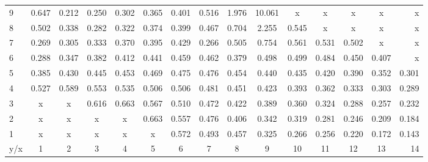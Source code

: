 \begin{tabular}{| l || c | c | c | c | c | c | c | c | c | c | c | c | c | r |}
\hline
9   &0.647	&0.212	&0.250	&0.302	&0.365	&0.401	&0.516	&1.976	&10.061	&x	    &x	    &x	    &x	    &x\\
8   &0.502	&0.338	&0.282	&0.322	&0.374	&0.399	&0.467	&0.704	&2.255	&0.545	&x	    &x	    &x	    &x\\
7   &0.269	&0.305	&0.333	&0.370	&0.395	&0.429	&0.266	&0.505	&0.754	&0.561	&0.531	&0.502	&x	    &x\\
6   &0.288	&0.347	&0.382	&0.412	&0.441	&0.459	&0.462	&0.379	&0.498	&0.499	&0.484	&0.450	&0.407	&x\\
5   &0.385	&0.430	&0.445	&0.453	&0.469	&0.475	&0.476	&0.454	&0.440	&0.435	&0.420	&0.390	&0.352	&0.301\\
4   &0.527	&0.589	&0.553	&0.535	&0.506	&0.506	&0.481	&0.451	&0.423	&0.393	&0.362	&0.333	&0.303	&0.289\\
3   &x	    &x	    &0.616	&0.663	&0.567	&0.510	&0.472	&0.422	&0.389	&0.360	&0.324	&0.288	&0.257	&0.232\\
2   &x	    &x	    &x	    &x	    &0.663	&0.557	&0.476	&0.406	&0.342	&0.319	&0.281	&0.246	&0.209	&0.184\\
1   &x	    &x	    &x	    &x	    &x	    &0.572	&0.493	&0.457	&0.325	&0.266	&0.256	&0.220	&0.172	&0.143\\ \hline \hline
y/x &1	    &2	    &3	    &4	    &5	    &6	    &7	    &8	    &9	    &10	    &11	    &12	    &13	    &14\\ \hline
\end{tabular}
